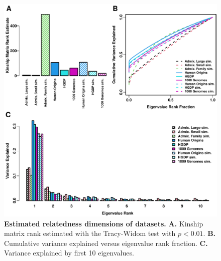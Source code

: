 \documentclass[11pt]{article}
\begin{document}
\begin{figure}[hp!]
  \centering
  \includegraphics[width=\textwidth]{eigen.pdf}
  \caption{
    {\bf Estimated relatedness dimensions of datasets.}
    \textbf{A.}
    Kinship matrix rank estimated with the Tracy-Widom test with $p < 0.01$.
    \textbf{B.}
    Cumulative variance explained versus eigenvalue rank fraction.
    \textbf{C.}
    Variance explained by first 10 eigenvalues.
  }
  \label{fig:eigen}
\end{figure}
\end{document}
